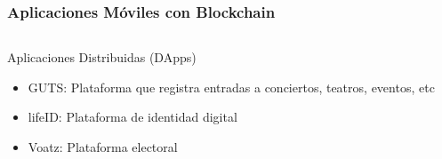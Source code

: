 \documentclass[usenames,dvipsnames]{beamer}
\begin{document}
\begin{frame}
\begin{columns}
\begin{column}{0.5\textwidth}
\begin{tikzpicture}
    \end{tikzpicture}
  \end{column}
  \end{columns}
\end{frame}

\begin{frame} 
\frametitle{Aplicaciones Móviles con Blockchain} 
  \begin{columns}
  \begin{column}{0.6\textwidth}
    \center \textcolor{UniGold}{Aplicaciones Distribuidas (DApps)}
    \begin{itemize}
      \item \textcolor{UniGold}{\small GUTS:} Plataforma que registra entradas a conciertos, teatros, eventos, etc
      \item \textcolor{UniGold}{lifeID:} Plataforma de identidad digital
      \item \textcolor{UniGold}{Voatz:} Plataforma electoral
    \end{itemize}
  \end{column}
  \begin{column}{0.4\textwidth}
  \end{column}
  \end{columns}
\end{frame}
\end{document}
